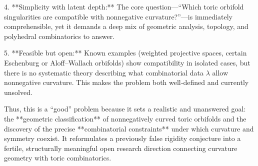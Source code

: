 4. **Simplicity with latent depth:**  
   The core question—“Which toric orbifold singularities are compatible with nonnegative curvature?”—is immediately comprehensible, yet it demands a deep mix of geometric analysis, topology, and polyhedral combinatorics to answer.

5. **Feasible but open:**  
   Known examples (weighted projective spaces, certain Eschenburg or Aloff–Wallach orbifolds) show compatibility in isolated cases, but there is no systematic theory describing what combinatorial data \(\lambda\) allow nonnegative curvature. This makes the problem both well‑defined and currently unsolved.

Thus, this is a “good” problem because it sets a realistic and unanswered goal: the **geometric classification** of nonnegatively curved toric orbifolds and the discovery of the precise **combinatorial constraints** under which curvature and symmetry coexist. It reformulates a previously false rigidity conjecture into a fertile, structurally meaningful open research direction connecting curvature geometry with toric combinatorics.